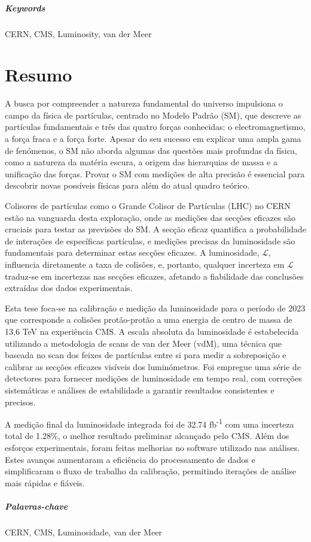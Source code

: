 \paragraph{Keywords} CERN, CMS, Luminosity, van der Meer

\cleardoublepage

\chapter*{Resumo}

A busca por compreender a natureza fundamental do universo impulsiona o campo da física de partículas, centrado no Modelo Padrão (SM), que descreve as partículas fundamentais e três das quatro forças conhecidas: o electromagnetismo, a força fraca e a força forte. Apesar do seu sucesso em explicar uma ampla gama de fenómenos, o SM não aborda algumas das questões mais profundas da física, como a natureza da matéria escura, a origem das hierarquias de massa e a unificação das forças. Provar o SM com medições de alta precisão é essencial para descobrir novas possíveis físicas para além do atual quadro teórico.

Colisores de partículas como o Grande Colisor de Partículas (LHC) no CERN estão na vanguarda desta exploração, onde as medições das secções eficazes são cruciais para testar as previsões do SM. A secção eficaz quantifica a probabilidade de interações de específicas partículas, e medições precisas da luminosidade são fundamentais para determinar estas secções eficazes. A luminosidade, \(\mathcal{L}\), influencia diretamente a taxa de colisões, e, portanto, qualquer incerteza em \(\mathcal{L}\) traduz-se em incertezas nas secções eficazes, afetando a fiabilidade das conclusões extraídas dos dados experimentais.

Esta tese foca-se na calibração e medição da luminosidade para o período de 2023 que corresponde a colisões protão-protão a uma energia de centro de massa de 13,6 TeV na experiência CMS. A escala absoluta da luminosidade é estabelecida utilizando a metodologia de scans de van der Meer (vdM), uma técnica que baseada no scan dos feixes de partículas entre si para medir a sobreposição e calibrar as secções eficazes visíveis dos luminómetros. Foi empregue uma série de detectores para fornecer medições de luminosidade em tempo real, com correções sistemáticas e análises de estabilidade a garantir resultados consistentes e precisos.

A medição final da luminosidade integrada foi de 32.74 fb\textsuperscript{-1} com uma incerteza total de 1.28\%, o melhor resultado preliminar alcançado pelo CMS. Além dos esforços experimentais, foram feitas melhorias no software utilizado nas análises. Estes avanços aumentaram a eficiência do processamento de dados e simplificaram o fluxo de trabalho da calibração, permitindo iterações de análise mais rápidas e fiáveis.

\paragraph{Palavras-chave} CERN, CMS, Luminosidade, van der Meer

\cleardoublepage
